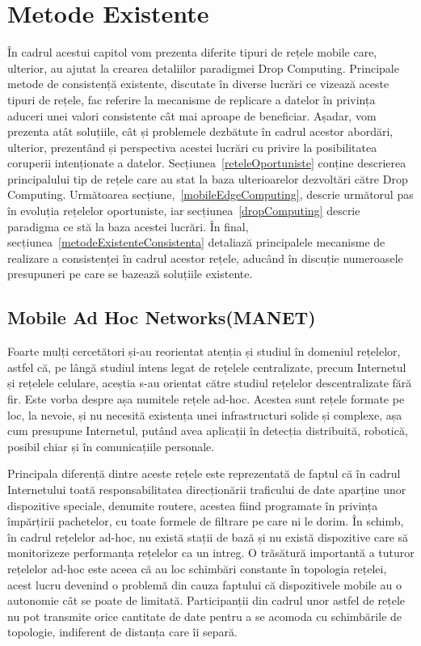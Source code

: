 \documentclass[12pt,a4paper]{report}
\begin{document}
\chapter{Metode Existente} \label{metodeExistente}
În cadrul acestui capitol vom prezenta diferite tipuri de rețele mobile care, ulterior, au ajutat la crearea detaliilor paradigmei Drop Computing. Principale metode de consistență existente, discutate în diverse lucrări ce vizează aceste tipuri de rețele, fac referire la mecanisme de replicare a datelor în privința aduceri unei valori consistente cât mai aproape de beneficiar. Așadar, vom prezenta atât soluțiile, cât și problemele dezbătute în cadrul acestor abordări, ulterior, prezentând și perspectiva acestei lucrări cu privire la posibilitatea coruperii intenționate a datelor.
Secțiunea~\ref{reteleOportuniste} conține descrierea principalului tip de rețele care au stat la baza ulterioarelor dezvoltări către Drop Computing. Următoarea secțiune,~\ref{mobileEdgeComputing}, descrie următorul pas în evoluția rețelelor oportuniste, iar secțiunea~\ref{dropComputing} descrie paradigma ce stă la baza acestei lucrări. În final, secțiunea~\ref{metodeExistenteConsistenta} detaliază principalele mecanisme de realizare a consistenței în cadrul acestor rețele, aducând în discuție numeroasele presupuneri pe care se bazează soluțiile existente.  
 
\iffalse 
\section{Mobile Ad Hoc Networks(MANET)}
Foarte mulți cercetători și-au reorientat atenția și studiul în domeniul rețelelor, astfel că, pe lângă studiul intens legat de rețelele centralizate, precum Internetul și rețelele celulare, aceștia s-au orientat către studiul rețelelor descentralizate fără fir. Este vorba despre așa numitele rețele ad-hoc\cite{MITArticle}. Acestea sunt rețele formate pe loc, la nevoie, și nu necesită existența unei infrastructuri solide și complexe, așa cum presupune Internetul, putând avea aplicații în detecția distribuită, robotică, posibil chiar și în comunicațiile personale.

Principala diferență dintre aceste rețele este reprezentată de faptul că în cadrul Internetului toată responsabilitatea direcționării traficului de date aparține unor dispozitive speciale, denumite routere, acestea fiind programate în privința împărțirii pachetelor, cu toate formele de filtrare pe care ni le dorim. În schimb, în cadrul rețelelor ad-hoc, nu există stații de bază și nu există dispozitive care să monitorizeze performanța rețelelor ca un intreg. O trăsătură importantă a tuturor rețelelor ad-hoc este aceea că au loc schimbări constante în topologia rețelei, acest lucru devenind o problemă din cauza faptului că dispozitivele mobile au o autonomie cât se poate de limitată. Participanții din cadrul unor astfel de rețele nu pot transmite orice cantitate de date pentru a se acomoda cu schimbările de topologie, indiferent de distanța care îi separă.
\end{document}
